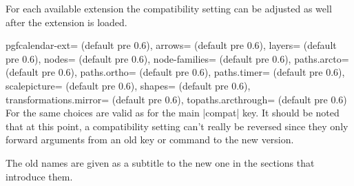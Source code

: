 \begin{multicols}{2}
\newcolumn\noindent
For each available extension the compatibility setting can be adjusted as well
after the extension is loaded.
\begin{keylist}{%
  pgfcalendar-ext= (default pre 0.6),
  arrows= (default pre 0.6),
  layers= (default pre 0.6),
  nodes= (default pre 0.6),
  node-families= (default pre 0.6),
  paths.arcto= (default pre 0.6),
  paths.ortho= (default pre 0.6),
  paths.timer= (default pre 0.6),
  scalepicture= (default pre 0.6),
  shapes= (default pre 0.6),
  transformations.mirror= (default pre 0.6),
  topaths.arcthrough= (default pre 0.6)%
}
  For  the same choices are valid as for the main |compat| key.
  It should be noted that at this point, a compatibility setting can't really be reversed
  since they only forward arguments from an old key or command to the new version.
  
  The old names are given as a subtitle to the new one in the sections that introduce them.
\end{keylist}
\end{multicols}